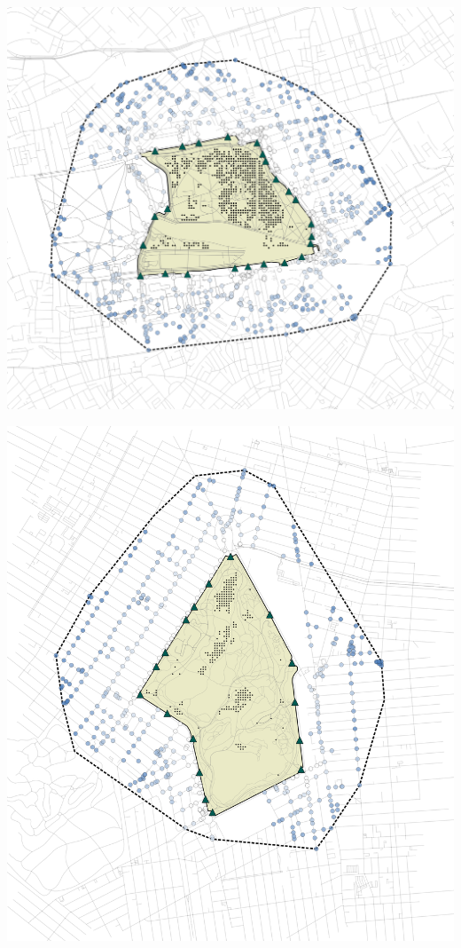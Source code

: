 \begin{multicols}{2}
\begin{minipage}{0.45\textwidth}
    \centering
    \includegraphics[width=\linewidth]{images/network/hyde_intersections_distance.png}\par\hspace{3pt}
    \includegraphics[width=\linewidth]{images/network/prospect_intersections_distance.png}\par\hspace{3pt}

\end{minipage}
\end{multicols}
